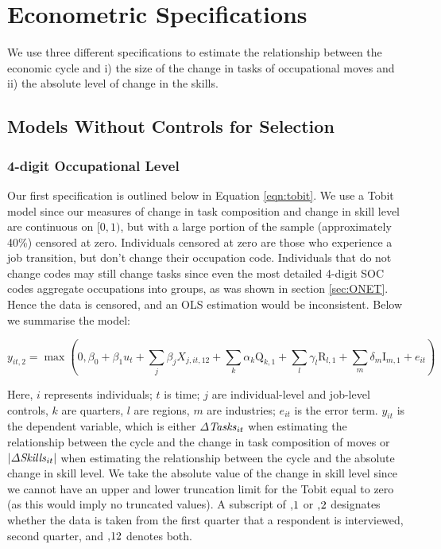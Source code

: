\documentclass[11pt, oneside]{article}
\begin{document}
 \section{Econometric Specifications}
\label{sec:Model}

We use three different specifications to estimate the relationship between the economic cycle and i) the size of the change in tasks of occupational moves and ii) the absolute level of change in the skills.

\subsection{Models Without Controls for Selection}
\label{sec:Tobits}

\subsubsection{4-digit Occupational Level}
Our first specification is outlined below in Equation \ref{eqn:tobit}. We use a Tobit model since our measures of change in task composition and change in skill level are continuous on $[0,1)$, but with a large portion of the sample (approximately 40\%) censored at zero. Individuals censored at zero are those who experience a job transition, but don't change their occupation code. Individuals that do not change codes may still change tasks since even the most detailed 4-digit SOC codes aggregate occupations into groups, as was shown in section \ref{sec:ONET}. Hence the data is censored, and an OLS estimation would be inconsistent. Below we summarise the model:

\begin{equation}
\label{eqn:tobit}
y_{it,2} =\max(0,\beta_0 + \beta_{1}u_{t} + \sum_{j} \beta_{j}X_{j,it,12} + \sum_{k} \alpha_{k} \text{Q}_{k,1} + \sum_{l} \gamma_{l} \text{R}_{l,1} + \sum_{m} \delta_{m} \text{I}_{m,1}+ e_{it})
\end{equation}

\noindent Here, $i$ represents individuals; $t$ is time; $j$ are  individual-level and job-level controls, $k$ are quarters, $l$ are regions, $m$ are industries; $e_{it}$ is the error term. $y_{it}$ is the dependent variable, which is either $\Delta\text{\textit{Tasks}}_{it}$ when estimating the relationship between the cycle and the change in task composition of moves or $|\Delta\text{\textit{Skills}}_{it}|$ when estimating the relationship between the cycle and the absolute change in skill level. We take the absolute value of the change in skill level since we cannot have an upper and lower truncation limit for the Tobit equal to zero (as this would imply no truncated values). A subscript of $,\hspace{-0.5mm}1$ or $,\hspace{-0.5mm}2$ designates whether the data is taken from the first quarter that a respondent is interviewed, second quarter, and $,\hspace{-0.5mm}12$ denotes both.
\end{document}
